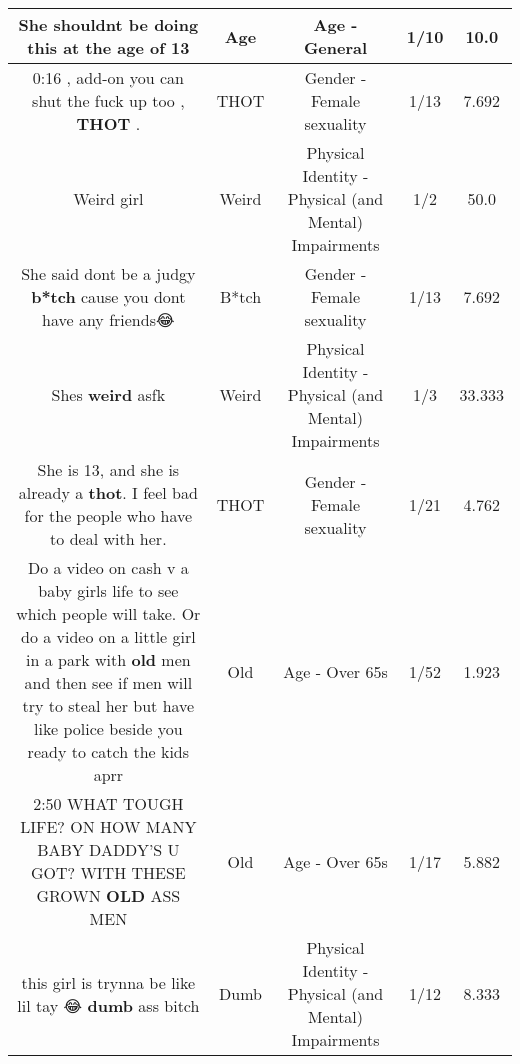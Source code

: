 \documentclass[11pt]{article}
\newlength\mylength
\begin{document}
\begin{center}
\begin{longtable}{|C{.65\mylength}|C{.30\mylength}|C{.12\mylength}|C{.12\mylength}|C{.12\mylength}|}
  \small She shouldnt be doing this at the \textbf{age} of 13\normalsize   & Age & Age - General & 1/10 & 10.0 \\  \hline
  \small 0:16 , add-on    you can shut the fuck up too , \textbf{THOT} .\normalsize   & THOT & Gender - Female sexuality & 1/13 & 7.692 \\  \hline
  \small Weird girl\normalsize   & Weird & Physical Identity - Physical (and Mental) Impairments & 1/2 & 50.0 \\  \hline
  \small She said dont be a judgy \textbf{b*tch} cause you dont have any friends😂\normalsize   & B*tch & Gender - Female sexuality & 1/13 & 7.692 \\  \hline
  \small Shes \textbf{weird} asfk\normalsize   & Weird & Physical Identity - Physical (and Mental) Impairments & 1/3 & 33.333 \\  \hline
  \small She is 13, and she is already a \textbf{thot}. I feel bad for the people who have to deal with her.\normalsize   & THOT & Gender - Female sexuality & 1/21 & 4.762 \\  \hline
  \small Do a video on cash v a baby girls life to see which people will take. Or do a video on a little girl in a park with \textbf{old} men and then see if men will try to steal her but have like police beside you ready to catch the kids aprr\normalsize   & Old & Age - Over 65s & 1/52 & 1.923 \\  \hline
  \small 2:50 WHAT TOUGH LIFE? ON HOW MANY BABY DADDY'S U GOT? WITH THESE GROWN \textbf{OLD} ASS MEN\normalsize   & Old & Age - Over 65s & 1/17 & 5.882 \\  \hline
  \small this girl is trynna be like lil tay 😂 \textbf{dumb} ass bitch\normalsize   & Dumb & Physical Identity - Physical (and Mental) Impairments & 1/12 & 8.333 \\  \hline

\end{longtable}
\end{center}
\end{document}
